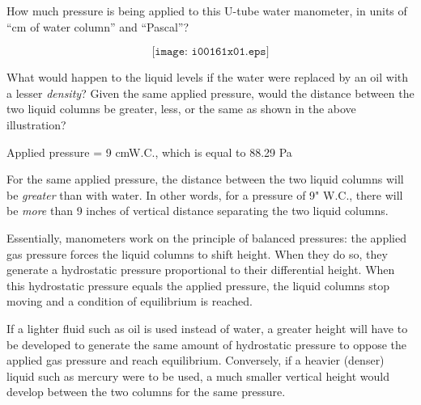 

How much pressure is being applied to this U-tube water manometer, in units of ``cm of water column'' and ``Pascal''?

$$\texttt{[image: i00161x01.eps]}$$

What would happen to the liquid levels if the water were replaced by an oil with a lesser {\it density}?  Given the same applied pressure, would the distance between the two liquid columns be greater, less, or the same as shown in the above illustration?







Applied pressure = 9 cmW.C., which is equal to 88.29 Pa

\vskip 10pt

For the same applied pressure, the distance between the two liquid columns will be {\it greater} than with water.  In other words, for a pressure of 9" W.C., there will be {\it more} than 9 inches of vertical distance separating the two liquid columns.

Essentially, manometers work on the principle of balanced pressures: the applied gas pressure forces the liquid columns to shift height.  When they do so, they generate a hydrostatic pressure proportional to their differential height.  When this hydrostatic pressure equals the applied pressure, the liquid columns stop moving and a condition of equilibrium is reached.

If a lighter fluid such as oil is used instead of water, a greater height will have to be developed to generate the same amount of hydrostatic pressure to oppose the applied gas pressure and reach equilibrium.  Conversely, if a heavier (denser) liquid such as mercury were to be used, a much smaller vertical height would develop between the two columns for the same pressure.











